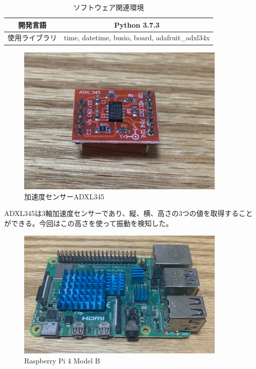 \begin{table}[htbp]
  \caption{ソフトウェア関連環境}
  \label{tb:meal_detection_spec_sw}
  \begin{center}
    \begin{tabular}{|c||c|}
      \hline
      開発言語 & Python 3.7.3 \\\hline
      使用ライブラリ &  time, datetime, busio, board, adafruit\_adxl34x \\\hline
    \end{tabular}
  \end{center}
\end{table}

\begin{figure}[htbp]
  \caption{加速度センサーADXL345}
  \label{fig:adxl345}
  \begin{center}
    \includegraphics[bb=0 0 1300 1000,width=10cm]{assets/adxl345.jpg}
  \end{center}
\end{figure}

ADXL345は3軸加速度センサーであり、縦、横、高さの3つの値を取得することができる。今回はこの高さを使って振動を検知した。

\begin{figure}[htbp]
  \caption{Raspberry Pi 4 Model B}
  \label{fig:raspi4_model_b}
  \begin{center}
    \includegraphics[bb=0 0 1300 800,width=10cm]{assets/raspi4_model_b.jpg}
  \end{center}
\end{figure}

